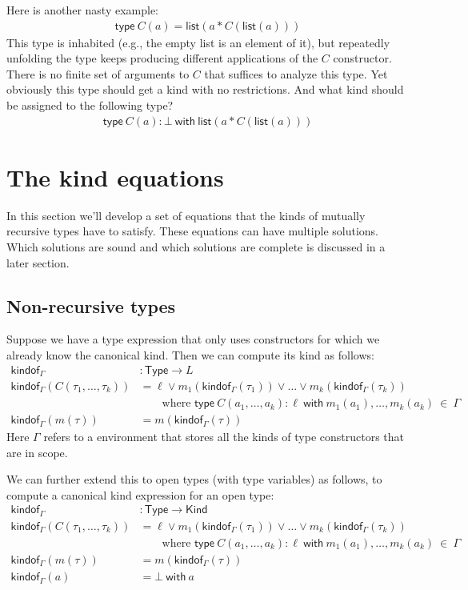\documentclass{article}
\newcommand{\Type}{\mathsf{Type}}
\newcommand{\type}{\mathsf{type\ }}
\newcommand{\Kind}{\mathsf{Kind}}
\newcommand{\with}{\mathsf{\ with\ }}
\begin{document}
Here is another nasty example:
\begin{align*}
    \mathsf{type\ } C(a) = \mathsf{list}(a \ast C(\mathsf{list}(a)))
\end{align*}
This type is inhabited (e.g., the empty list is an element of it), but repeatedly unfolding the type keeps producing different applications of the $C$ constructor. There is no finite set of arguments to $C$ that suffices to analyze this type. Yet obviously this type should get a kind with no restrictions. And what kind should be assigned to the following type?
\begin{align*}
    \mathsf{type\ } C(a) : \bot \mathsf{\ with\ } \mathsf{list}(a \ast C(\mathsf{list}(a)))
\end{align*}


\section{The kind equations}

In this section we'll develop a set of equations that the kinds of mutually recursive types have to satisfy. These equations can have multiple solutions. Which solutions are sound and which solutions are complete is discussed in a later section.

\subsection{Non-recursive types}

Suppose we have a type expression that only uses constructors for which we already know the canonical kind.
Then we can compute its kind as follows:
\newcommand{\kindof}{\mathsf{kindof}_\Gamma}
\begin{align*}
    \kindof &: \Type \to L\\
    \kindof(C(\tau_1, \dots, \tau_k)) &= \ell \vee m_1(\kindof(\tau_1)) \vee \dots \vee m_k(\kindof(\tau_k))\\
    &\qquad \text{where } \type C(a_1, \dots, a_k) : \ell \with m_1(a_1), \dots, m_k(a_k) \ \in\ \Gamma\\
    \kindof(m(\tau)) &= m(\kindof(\tau))
\end{align*}
Here $\Gamma$ refers to a environment that stores all the kinds of type constructors that are in scope.

We can further extend this to open types (with type variables) as follows, to compute a canonical kind expression for an open type:
\begin{align*}
    \kindof &: \Type \to \Kind\\
    \kindof(C(\tau_1, \dots, \tau_k)) &= \ell \vee m_1(\kindof(\tau_1)) \vee \dots \vee m_k(\kindof(\tau_k))\\
    &\qquad \text{where } \type C(a_1, \dots, a_k) : \ell \with m_1(a_1), \dots, m_k(a_k) \ \in\ \Gamma\\
    \kindof(m(\tau)) &= m(\kindof(\tau))\\
    \kindof(a) &= \bot \with a
\end{align*}
\end{document}
